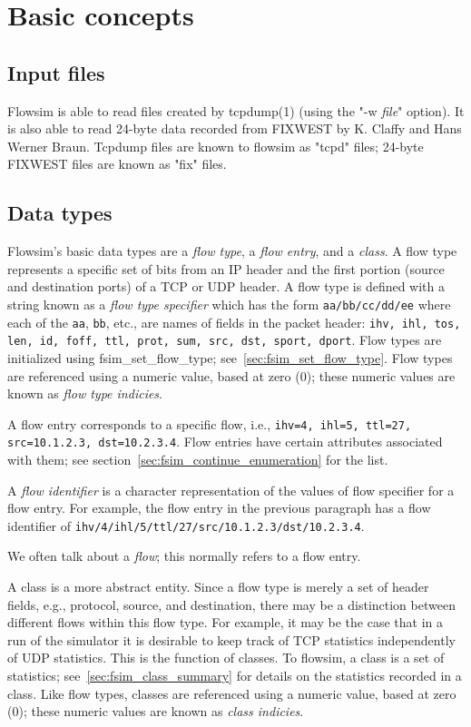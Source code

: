 \documentclass{article}
\begin{document}
\section{Basic concepts}
\subsection{Input files}
Flowsim is able to read files created by tcpdump(1) (using the "-w
\emph{file}" option).  It is also able to read 24-byte data recorded
from FIXWEST by K. Claffy and Hans Werner Braun.  Tcpdump files are
known to flowsim as "tcpd" files; 24-byte FIXWEST files are known as
"fix" files.

\subsection{Data types}
Flowsim's basic data types are a \emph{flow type}, a \emph{flow entry},
and a \emph{class}.  A flow type represents a specific set of bits from
an IP header and the first portion (source and destination ports) of a
TCP or UDP header.  A flow type is defined with a string known as a
\emph{flow type specifier} which has the form \texttt{aa/bb/cc/dd/ee}
where each of the \texttt{aa}, \texttt{bb}, etc., are names of
fields in the packet
header:
\texttt{ihv, ihl, tos, len, id, foff, ttl, prot, sum, src, dst, sport, dport}.
Flow types are initialized using fsim\_set\_flow\_type;
see~\ref{sec:fsim_set_flow_type}.  Flow types are referenced using a
numeric value, based at zero (0); these numeric values are known as
\emph{flow type indicies}.

A flow entry corresponds to a specific flow, i.e.,
\texttt{ihv=4, ihl=5, ttl=27, src=10.1.2.3, dst=10.2.3.4}.
Flow entries have certain attributes associated with them; see
section~\ref{sec:fsim_continue_enumeration} for the list.

A \emph{flow identifier} is a character representation of the values of
flow specifier for a flow entry.  For example, the flow entry in the
previous paragraph has a flow identifier of
\texttt{ihv/4/ihl/5/ttl/27/src/10.1.2.3/dst/10.2.3.4}.

We often talk about a \emph{flow}; this normally refers to a flow
entry.

A class is a more abstract entity.  Since a flow type is merely a set
of header fields, e.g., protocol, source, and destination, there may be a
distinction between different flows within this flow type.  For
example, it may be the case that in a run of the simulator it is
desirable to keep track of TCP statistics independently of UDP
statistics.  This is the function of classes.  To flowsim, a class is a
set of statistics; see~\ref{sec:fsim_class_summary} for details on the
statistics recorded in a class.  Like flow types, classes are
referenced using a numeric value, based at zero (0); these numeric
values are known as \emph{class indicies}.
\end{document}
